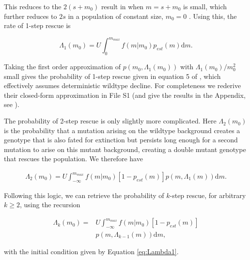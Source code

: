 \documentclass[9pt,twocolumn,twoside,lineno]{gsajnl}
\begin{document}
\noindent This reduces to the $2(s+m_{0})$ result in \cite{Otto1997} when $m = s + m_{0}$ is small, which further reduces to $2s$ in a population of constant size, $m_{0}=0$ \citep{Haldane1927}.
Using this, the rate of 1-step rescue is

\begin{equation}\label{eq:Lambda1}
\Lambda_1(m_0) = U \int_0^{m_{max}} f(m|m_0) p_{est}(m) \mathrm{d}m.
\end{equation}

\noindent Taking the first order approximation of $p(m_0,\Lambda_1(m_0))$ with $\Lambda_1(m_0)/m_0^2$ small gives the probability of 1-step rescue given in equation 5 of \cite{Anciaux2018}, which effectively assumes deterministic wildtype decline.
For completeness we rederive their closed-form approximation in File S1 (and give the results in the Appendix, see ).

The probability of 2-step rescue is only slightly more complicated.
Here $\Lambda_2(m_0)$ is the probability that a mutation arising on the wildtype background creates a genotype that is also fated for extinction but persists long enough for a second mutation to arise on this mutant background, creating a double mutant genotype that rescues the population.
We therefore have

\begin{equation}\label{eq:Lambda2}
\begin{aligned}
\Lambda_2(m_0) = U \int_{-\infty}^{m_{max}} f(m|m_0) \left[ 1 - p_{est}(m) \right] p(m,\Lambda_{1}(m)) \mathrm{d}m.
\end{aligned}
\end{equation}

Following this logic, we can retrieve the probability of $k$-step rescue, for arbitrary $k\geq2$,  using the recursion

\begin{equation}\label{eq:Lambdak}
\begin{aligned}
\Lambda_k(m_0) =& U \int_{-\infty}^{m_{max}} f(m|m_0) \left[ 1 - p_{est}(m) \right] \\
                       & p(m,\Lambda_{k-1}(m)) \mathrm{d}m,
\end{aligned}
\end{equation}

\noindent with the initial condition given by Equation \ref{eq:Lambda1}.
\end{document}
